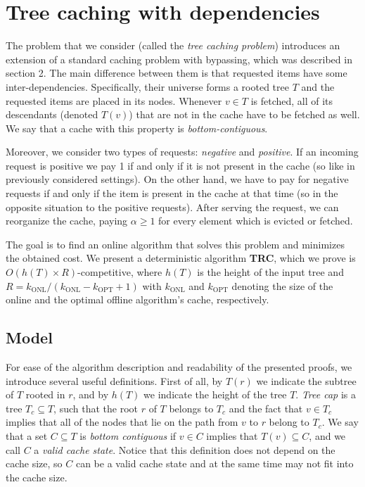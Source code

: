 \section{Tree caching with dependencies} \label{tree_caching_algo} The problem
that we consider (called the \textit{tree caching problem}) introduces an extension
of a standard caching problem with bypassing, which was described in section 2.
The main difference between them is that requested items have some
inter-dependencies. Specifically, their universe forms a rooted tree $T$ and the
requested items are placed in its nodes.  Whenever $v \in T$ is fetched, all of
its descendants (denoted $T(v)$) that are not in the cache have to be fetched 
as well. We say that a cache with this property is \textit{bottom-contiguous}.

Moreover, we consider two types of requests: \textit{negative} and
\textit{positive}. If an incoming request is positive we pay 1 if and only if it
is not present in the cache (so like in previously considered settings). On the
other hand, we have to pay for negative requests if and only if the item is
present in the cache at that time (so in the opposite situation to the positive
requests). After serving the request, we can reorganize the cache, paying
$\alpha \geq 1$ for every element which is evicted or fetched. 

The goal is to find an online algorithm that solves this problem and minimizes
the obtained cost. We present a deterministic algorithm \textbf{TRC}, which we
prove is $O(h(T) \times R)$-competitive, where $h(T)$ is the height of the input tree
and $R = k_{\mathrm{ONL}}/(k_{\mathrm{ONL}} - k_{\mathrm{OPT}} +1)$ with
$k_{\mathrm{ONL}}$ and $k_{\mathrm{OPT}}$ denoting the size of the online and
the optimal offline algorithm's cache, respectively.

\subsection{Model}  For ease of the algorithm description
and readability of the presented proofs, we introduce several useful definitions.
First of all, by $T(r)$ we indicate the subtree of $T$ rooted in $r$, and by
$h(T)$ we indicate the height of the tree $T$. \textit{Tree cap} is a tree $T_c \subseteq
T$, such that the root $r$ of $T$ belongs to $T_c$ and the fact that $v \in T_c$
implies that all of the nodes that lie on the path from $v$ to $r$ belong to
$T_c$.  We say that a set $C \subseteq T$ is \textit{bottom contiguous} if $v
\in C$ implies that $T(v) \subseteq C$, and we call $C$ a \textit{valid cache state}.
Notice that this definition does not depend on the cache size, so $C$ can be
a valid cache state and at the same time may not fit into the cache size.

